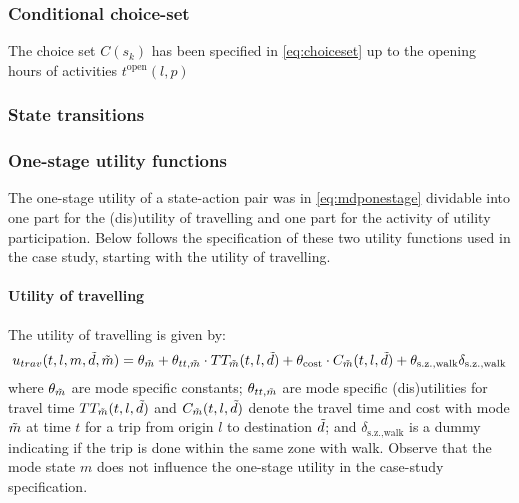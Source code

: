 \subsubsection{Conditional choice-set}
The choice set $C(s_k)$ has been specified in \eqref{eq:choiceset} up to the opening hours of activities $t^{\text{open}}({l,p})$


\subsubsection{State transitions}

\subsubsection{One-stage utility functions}
\newcommand{\cost}{\text{cost}}
\newcommand{\car}{\text{car}}
\newcommand{\pt}{\text{PT}}
\newcommand{\walk}{\text{walk}}
\newcommand{\bike}{\text{bike}}
\newcommand{\dummy}[1]{\delta_{#1}}
\newcommand{\hi}{\text{h.i}}
\newcommand{\wait}{\text{wait}}
\newcommand{\geqfive}{\text{s.z.,walk}}
\newcommand{\mc}{\theta}
\newcommand{\ac}{C}
\newcommand{\acp}{\theta}
\newcommand{\dura}[1]{\Delta t_#1}
\newcommand{\TT}{TT}
\newcommand{\ustay}{\avgu_\text{stay}}
\newcommand{\stay}{\text{stay}}

The one-stage utility of a state-action pair was in \eqref{eq:mdponestage} dividable into one part for the (dis)utility of travelling and one part for the activity of utility participation. Below follows the specification of these two utility functions used in the case study, starting with the utility of travelling.
\paragraph{Utility of travelling}
The utility of travelling is given by:
\begin{equation}
u_{trav}(t,l,m,\act{d},\act{m}) = \mc_{\act{m}} + \theta_{tt,\act{m}} \cdot \TT_{\act{m}}(t,l,\act{d}) + \theta_{\cost} \cdot C_{\act{m}}(t,l,\act{d}) +\theta_{\geqfive} \dummy{\geqfive}
\end{equation}
where $\mc_{\act{m}}$ are mode specific constants; $\theta_{tt,\tilde{m}}$ are mode specific (dis)utilities for travel time  $\TT_{\act{m}}(t,l,\act{d})$ and $C_{\tilde{m}}(t,l,\tilde{d})$ denote the travel time and cost with mode $\tilde{m}$ at time $t$ for a trip from origin $l$ to destination $\tilde{d}$; and $\dummy{\geqfive}$ is a dummy indicating if the trip is done within the same zone with walk. Observe that the mode state $m$ does not influence the one-stage utility in the case-study specification.

